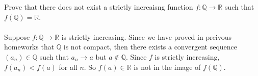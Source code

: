 \documentclass[]{exam}
\begin{document}
\begin{questions}

\question Prove that there does not exist a strictly increaisng function $f:\mathbb{Q}\to\mathbb{R}$ such that $f(\mathbb{Q}) = \mathbb{R}$.
\\
\\ Suppose $f:\mathbb{Q}\to\mathbb{R}$ is strictly increasing. Since we have proved in preivous homeworks that $\mathbb{Q}$ is not compact, then there exists a convergent sequence $(a_n)\in\mathbb{Q}$ such that $a_n\to a$ but $a\not\in\mathbb{Q}$. Since $f$ is strictly increasing, $f(a_n) < f(a)$ for all $n$. So $f(a)\in\mathbb{R}$ is not in the image of $f(\mathbb{Q})$.

\end{questions}
\end{document}
